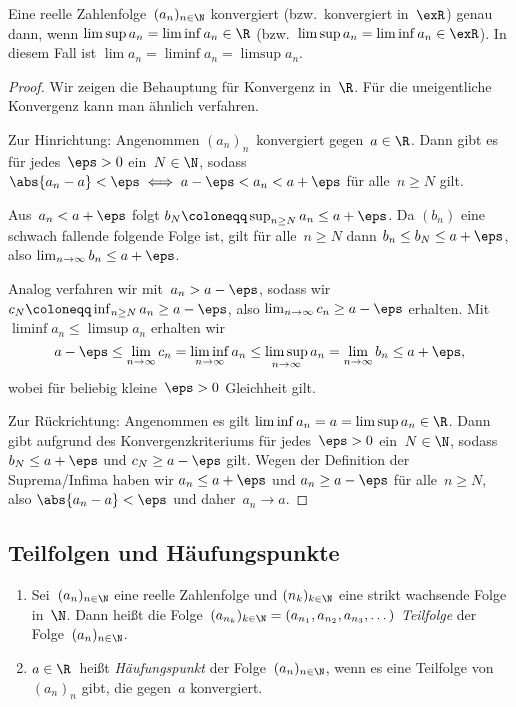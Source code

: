 \documentclass[a4paper]{article}
\begin{document}
\begin{theorem}
    Eine reelle Zahlenfolge~$(a_n)_{n\in\N}$ konvergiert (bzw.\ konvergiert in~$\exR$) genau dann, wenn $\limsup a_n = \liminf a_n \in \R$ (bzw.\ $\limsup a_n = \liminf a_n \in \exR$). In diesem Fall ist $\lim a_n = \liminf a_n = \limsup a_n$.
\end{theorem}

\begin{proof}
    Wir zeigen die Behauptung für Konvergenz in~$\R$. Für die uneigentliche Konvergenz kann man ähnlich verfahren.

    Zur Hinrichtung: Angenommen $(a_n)_n$~konvergiert gegen~$a \in \R$. Dann gibt es für jedes~$\eps > 0$ ein~$N \in \N$, sodass $\abs{a_n-a} < \eps \iff a-\eps < a_n < a+\eps$ für alle~$n \geq N$ gilt.

    Aus~$a_n < a+\eps$ folgt $b_N \coloneqq \sup_{n\geq N} a_n \leq a+\eps$. Da $(b_n)$ eine schwach fallende folgende Folge ist, gilt für alle~$n \geq N$ dann $b_n \leq b_N \leq a+\eps$, also $\lim_{n\to\infty} b_n \leq a+\eps$.

    Analog verfahren wir mit~$a_n > a-\eps$, sodass wir $c_N \coloneqq \inf_{n\geq N} a_n \geq a-\eps$, also $\lim_{n\to\infty} c_n \geq a-\eps$ erhalten. Mit $\liminf a_n \leq \limsup a_n$ erhalten wir
    \begin{equation*}
        a-\eps \leq \lim_{n\to\infty} c_n = \liminf_{n\to\infty} a_n \leq \limsup_{n\to\infty} a_n = \lim_{n\to\infty} b_n \leq a+\eps,
    \end{equation*}
    wobei für beliebig kleine~$\eps > 0$ Gleichheit gilt.

    Zur Rückrichtung: Angenommen es gilt $\liminf a_n = a = \limsup a_n \in \R$. Dann gibt aufgrund des Konvergenzkriteriums für jedes~$\eps > 0$ ein~$N \in \N$, sodass $b_N \leq a+\eps$ und $c_N \geq a-\eps$ gilt. Wegen der Definition der Suprema/Infima haben wir $a_n \leq a+\eps$ und $a_n \geq a-\eps$ für alle~$n \geq N$, also $\abs{a_n-a} < \eps$ und daher~$a_n \to a$.
\end{proof}

\subsection{Teilfolgen und Häufungspunkte}

\begin{definition}\leavevmode
    \begin{enumerate}
        \item Sei~$(a_n)_{n\in\N}$ eine reelle Zahlenfolge und $(n_k)_{k\in\N}$ eine strikt wachsende Folge in~$\N$. Dann heißt die Folge~$(a_{n_k})_{k\in\N} = (a_{n_1}, a_{n_2}, a_{n_3}, \dots)$ \emph{Teilfolge} der Folge~$(a_n)_{n\in\N}$.
        \item $a \in \R$~heißt \emph{Häufungspunkt} der Folge~$(a_n)_{n\in\N}$, wenn es eine Teilfolge von~$(a_n)_n$ gibt, die gegen~$a$ konvergiert.
    \end{enumerate}
\end{definition}
\end{document}

